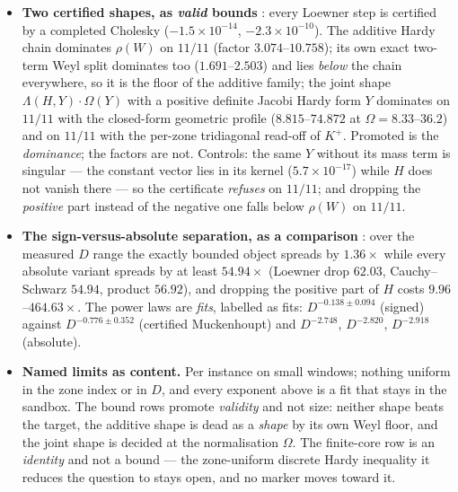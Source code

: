 \documentclass[11pt,a4paper]{article}
\begin{document}
\begin{itemize}[leftmargin=1.5em]
its value ($65.5$--$4244$) is \emph{reported} and neither its size nor its zone behaviour is
promoted. Replacing the local endpoint mass by $\lambda_{\max}(K)$ inflates it by $\ge358$.
\item \textbf{Two certified shapes, as \emph{valid} bounds} \mE: every Loewner step is certified by a
completed Cholesky ($-1.5\times10^{-14}$, $-2.3\times10^{-10}$). The additive Hardy chain dominates
$\rho(W)$ on $11/11$ (factor $3.074$--$10.758$); its own exact two-term Weyl split dominates too
($1.691$--$2.503$) and lies \emph{below} the chain everywhere, so it is the floor of the additive
family; the joint shape $\Lambda(H,Y)\cdot\Omega(Y)$ with a positive definite Jacobi Hardy form $Y$
dominates on $11/11$ with the closed-form geometric profile ($8.815$--$74.872$ at
$\Omega=8.33$--$36.2$) and on $11/11$ with the per-zone tridiagonal read-off of $K^{+}$. Promoted is
the \emph{dominance}; the factors are not. Controls: the same $Y$ without its mass term is singular
--- the constant vector lies in its kernel ($5.7\times10^{-17}$) while $H$ does not vanish there ---
so the certificate \emph{refuses} on $11/11$; and dropping the \emph{positive} part instead of the
negative one falls below $\rho(W)$ on $11/11$.
\item \textbf{The sign-versus-absolute separation, as a comparison} \mX: over the measured $D$ range
the exactly bounded object spreads by $1.36\times$ while every absolute variant spreads by at least
$54.94\times$ (Loewner drop $62.03$, Cauchy--Schwarz $54.94$, product $56.92$), and dropping the
positive part of $H$ costs $9.96$--$464.63\times$. The power laws are \emph{fits}, labelled as fits:
$D^{-0.138\pm0.094}$ (signed) against $D^{-0.776\pm0.352}$ (certified Muckenhoupt) and $D^{-2.748}$,
$D^{-2.820}$, $D^{-2.918}$ (absolute).
\item \textbf{Named limits as content.} Per instance on small windows; nothing uniform in the zone
index or in $D$, and every exponent above is a fit that stays in the sandbox. The bound rows promote
\emph{validity} and not size: neither shape beats the target, the additive shape is dead as a
\emph{shape} by its own Weyl floor, and the joint shape is decided at the normalisation $\Omega$.
The finite-core row is an \emph{identity} and not a bound --- the zone-uniform discrete Hardy
inequality it reduces the question to stays open, and no marker moves toward it.
\end{itemize}
\end{document}
